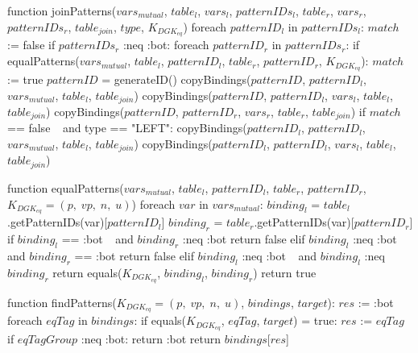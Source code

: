 function joinPatterns($vars_{mutual}$, $table_l$, $vars_l$, $patternIDs_l$, $table_r$, $vars_r$, $patternIDs_r$, $table_{join}$, $type$, $K_{DGK_{eq}}$) 
    foreach $patternID_l$ in $patternIDs_l$:
        $match$ := false
        if $patternIDs_r$ :neq :bot:
            foreach $patternID_r$ in $patternIDs_r$:
                if equalPatterns($vars_{mutual}$, $table_l$, $patternID_l$, $table_r$, $patternID_r$, $K_{DGK_{eq}}$): 
                    $match$ := true
                    $patternID$ = generateID()
                    copyBindings($patternID$, $patternID_l$, $vars_{mutual}$, $table_l$, $table_{join}$)
                    copyBindings($patternID$, $patternID_l$, $vars_l$, $table_l$, $table_{join}$)
                    copyBindings($patternID$, $patternID_r$, $vars_r$, $table_r$, $table_{join}$)
        if $match$ == false $\:\:$ and type == "LEFT": 
            copyBindings($patternID_l$, $patternID_l$, $vars_{mutual}$, $table_l$, $table_{join}$)
            copyBindings($patternID_l$, $patternID_l$, $vars_l$, $table_l$, $table_{join}$)

function equalPatterns($vars_{mutual}$, $table_l$, $patternID_l$, $table_r$, $patternID_r$, $K_{DGK_{eq}} = (p, \; vp, \; n, \; u)$) 
    foreach $var$ in $vars_{mutual}$: 
        $binding_l$ = $table_l$.getPatternIDs(var)[$patternID_l$]
        $binding_r$ = $table_r$.getPatternIDs(var)[$patternID_r$]
        if $binding_l$ == :bot $\:\:$ and $binding_r$ :neq :bot
            return false
        elif $binding_l$ :neq :bot $\:\:$ and $binding_r$ == :bot
            return false
        elif $binding_l$ :neq :bot $\:\:$ and $binding_l$ :neq $binding_r$
            return equals($K_{DGK_{eq}}$, $binding_l$, $binding_r$)
    return true

function findPatterns($K_{DGK_{eq}} = (p, \; vp, \; n, \; u)$, $bindings$, $target$):
    $res$ := :bot
    foreach $eqTag$ in $bindings$:
        if equals($K_{DGK_{eq}}$, $eqTag$, $target$) = true:
            $res$ := $eqTag$
    if $eqTagGroup$ :neq :bot:
        return :bot
    return $bindings$[$res$]